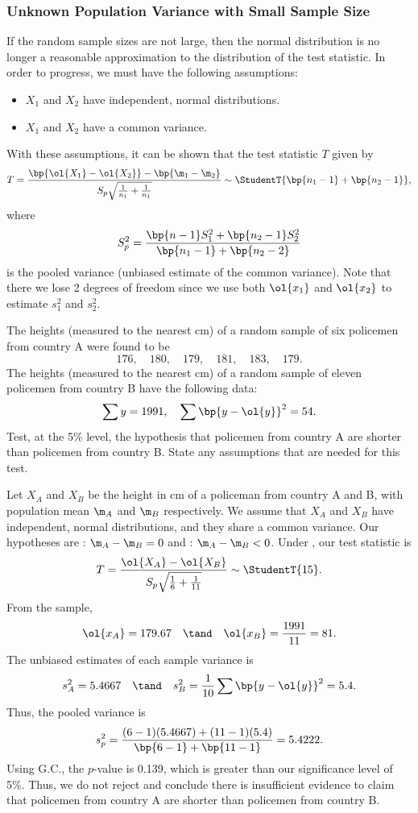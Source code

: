 \subsubsection{Unknown Population Variance with Small Sample Size}

If the random sample sizes are not large, then the normal distribution is no longer a reasonable approximation to the distribution of the test statistic. In order to progress, we must have the following assumptions:
\begin{itemize}
    \item $X_1$ and $X_2$ have independent, normal distributions.
    \item $X_1$ and $X_2$ have a common variance.
\end{itemize}
With these assumptions, it can be shown that the test statistic $T$ given by \[T = \frac{\bp{\ol{X_1} - \ol{X_2}} - \bp{\m_1 - \m_2}}{S_p \sqrt{\frac1{n_1} + \frac1{n_1}}} \sim \StudentT{\bp{n_1 - 1} + \bp{n_2 - 1}},\] where \[S^2_p = \frac{\bp{n-1} S_1^2 + \bp{n_2 - 1} S_2^2}{\bp{n_1 - 1} + \bp{n_2 - 2}}\] is the pooled variance (unbiased estimate of the common variance). Note that there we lose 2 degrees of freedom since we use both $\ol{x_1}$ and $\ol{x_2}$ to estimate $s_1^2$ and $s_2^2$.

\begin{sample}
    The heights (measured to the nearest cm) of a random sample of six policemen from country A were found to be \[176, \quad 180, \quad 179, \quad 181, \quad 183, \quad 179.\] The heights (measured to the nearest cm) of a random sample of eleven policemen from country B have the following data: \[\sum y = 1991, \quad \sum \bp{y - \ol{y}}^2 = 54.\] Test, at the 5\% level, the hypothesis that policemen from country A are shorter than policemen from country B. State any assumptions that are needed for this test.
\end{sample}
\begin{sampans}
    Let $X_A$ and $X_B$ be the height in cm of a policeman from country A and B, with population mean $\m_A$ and $\m_B$ respectively. We assume that $X_A$ and $X_B$ have independent, normal distributions, and they share a common variance. Our hypotheses are \nullhyp: $\m_A - \m_B = 0$ and \althyp: $\m_A - \m_B < 0$. Under \nullhyp, our test statistic is \[T = \frac{\ol{X_A} - \ol{X_B}}{S_p \sqrt{\frac16 + \frac1{11}}} \sim \StudentT{15}.\] From the sample, \[\ol{x_A} = 179.67 \quad \tand \quad \ol{x_B} = \frac{1991}{11} = 81.\] The unbiased estimates of each sample variance is \[s_A^2 = 5.4667 \quad \tand \quad s_B^2 = \frac1{10} \sum \bp{y - \ol{y}}^2 = 5.4.\] Thus, the pooled variance is \[s_p^2 = \frac{(6-1)(5.4667) + (11-1)(5.4)}{\bp{6-1} + \bp{11-1}} = 5.4222.\] Using G.C., the $p$-value is 0.139, which is greater than our significance level of 5\%. Thus, we do not reject \nullhyp{} and conclude there is insufficient evidence to claim that policemen from country A are shorter than policemen from country B.
\end{sampans}

